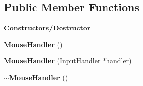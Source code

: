 \subsection*{Public Member Functions}
\begin{Indent}\textbf{ Constructors/\+Destructor}\par
\begin{DoxyCompactItemize}
\item 
\mbox{\label{classrev_1_1_mouse_handler_aa8f91e6ac3079ed7eb4c7207e1ebee5e}} 
{\bfseries Mouse\+Handler} ()
\item 
\mbox{\label{classrev_1_1_mouse_handler_adf371917397a3e079476751f067086c1}} 
{\bfseries Mouse\+Handler} (\mbox{\hyperlink{classrev_1_1_input_handler}{Input\+Handler}} $\ast$handler)
\item 
\mbox{\label{classrev_1_1_mouse_handler_ae1e39c849cbd004362ea834bb22a28b2}} 
{\bfseries $\sim$\+Mouse\+Handler} ()
\end{DoxyCompactItemize}
\end{Indent}

